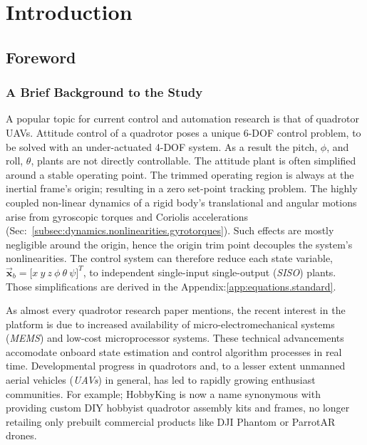 \chapter{Introduction}
\label{ch:intro}
\section{Foreword}
\label{sec:intro.foreword}
\subsection{A Brief Background to the Study}
\label{subsec:intro.foreword.background}
A popular topic for current control and automation research is that of quadrotor UAVs. Attitude control of a quadrotor poses a unique 6-DOF control problem, to be solved with an under-actuated 4-DOF system. As a result the pitch, $\phi$, and roll, $\theta$, plants are not directly controllable. The attitude plant is often simplified around a stable operating point. The trimmed operating region is always at the inertial frame's origin; resulting in a zero set-point tracking problem. The highly coupled non-linear dynamics of a rigid body's translational and angular motions arise from gyroscopic torques and Coriolis accelerations (Sec:~\ref{subsec:dynamics.nonlinearities.gyrotorques}). Such effects are mostly negligible around the origin, hence the origin trim point decouples the system's nonlinearities. The control system can therefore reduce each state variable, $\vec{\mathbf{x}}_b=\big[x~y~z~\phi~\theta~\psi\big]^T$, to independent single-input single-output (\emph{SISO}) plants. Those simplifications are derived in the Appendix:\ref{app:equations.standard}.
\par
As almost every quadrotor research paper mentions, the recent interest in the platform is due to increased availability of micro-electromechanical systems (\emph{MEMS}) and low-cost microprocessor systems. These technical advancements accomodate onboard state estimation and control algorithm processes in real time. Developmental progress in quadrotors and, to a lesser extent unmanned aerial vehicles (\emph{UAVs}) in general, has led to rapidly growing enthusiast communities. For example; HobbyKing\cite{hobbyking} is now a name synonymous with providing custom DIY hobbyist quadrotor assembly kits and frames, no longer retailing only prebuilt commercial products like DJI Phantom\cite{phantom} or ParrotAR\cite{parrotar} drones.
